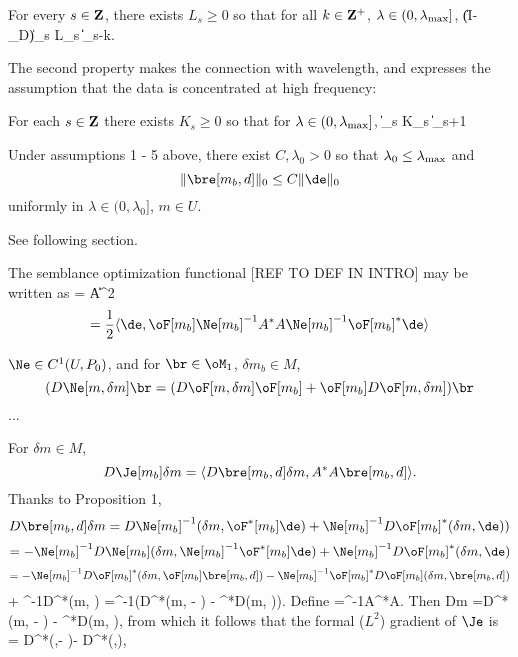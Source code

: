  For every $s \in \bf{Z}$, there exists
$L_s \ge 0$ so that for all $k \in \bf{Z}^+$, $\lambda \in
(0, \lambda_{\rm max}]$,
\be
\label{micro}
\|(I- \Pi_D)\de\|_s \le L_s \|\de\|_{s-k}.
\ee

The second property makes the connection with wavelength, and expresses
the assumption that the data is concentrated at high frequency:

For each $s \in \bf{Z}$ there exists $K_s
\ge 0$ so that for  $\lambda \in
(0, \lambda_{\rm max}]$,
\be
\label{hfcd}
\|\de\|_{s} \le K_s \lambda\|\de\|_{s+1}
\ee

Under assumptions 1 - 5 above, there exist $C,\lambda_0>0$ so that $\lambda_0 \le \lambda_{\rm max}$ and
\[
\|\bre[m_b,d]\|_0 \le C\|\de\|_0
\]
uniformly in $\lambda \in (0,\lambda_0]$, $m \in U$.


 See following section. %


The semblance optimization functional [REF TO DEF IN INTRO] may be written as
\be
\label{tgt}
\Je[m_b] = \|A\bre[m_b,d]\|^2
\ee
\[
=\frac{1}{2}\langle \de, \oF[m_b]\Ne[m_b]^{-1} A^*A \Ne[m_b]^{-1}\oF[m_b]^*\de \rangle
\]

 $\Ne \in C^1(U,P_0)$, and for $\br \in \oM_1$, $\delta m_b \in M$,
\[
(D\Ne[m,\delta m]\br = (D\oF[m,\delta m]\oF[m_b]+\oF[m_b]D\oF[m,\delta m])\br
\]
 ...

For $\delta m \in M$,
\[
D\Je[m_b]\delta m = \langle D\bre[m_b,d]\delta m, A^*A\bre[m_b,d]\rangle.
\]
Thanks to Proposition 1,
\[
D\bre[m_b,d]\delta m = 
D\Ne[m_b]^{-1}(\delta m,\oF^*[m_b]\de) + \Ne[m_b]^{-1}D\oF[m_b]^*(\delta m, \de))
\]
\[
= -\Ne[m_b]^{-1}D\Ne[m_b](\delta m,\Ne[m_b]^{-1}\oF^*[m_b]\de) + \Ne[m_b]^{-1}D\oF[m_b]^*(\delta m, \de)
\]
\[
=-\Ne[m_b]^{-1}D\oF[m_b]^*(\delta m,\oF[m_b]\bre[m_b,d]) - \Ne[m_b]^{-1}\oF[m_b]^*D\oF[m_b](\delta m,\bre[m_b,d])
\]
\be
\label{prerderiv}
+ \Ne[m_b]^{-1}D\oF[m_b]^*(\delta m, \de)
\ee
\be
\label{rderiv}
=\Ne^{-1}(D\oF[m_b]^*(\delta m, \de - \oF[m_b]\bre[m_b,d]) - \oF[m_b]^*D\oF[m_b](\delta m, \bre[m_b,d])).
\ee
Define
\be
\label{qdef}
\bqe[m_b]=\Ne[m_b]^{-1}A^*A\bre[m_b,d].
\ee
Then
\be
\label{Jderiv}
D\Je[m_b]\delta m =\langle D\oF[m_b]^*(\delta m, \de - \oF[m_b]\bre[m_b,d]) - \oF[m_b]^*D\oF[m_b](\delta m, \bre[m_b,d]), \bqe[m_b]\rangle 
\ee
from which it follows that the formal ($L^2$) gradient of $\Je$ is 
\be
\label{grad}
\nabla \Je[m_b] = D\oF[m_b]^*(\bqe[m_b],\de - \oF[m_b]\bre[m_b,d])- D\oF[m_b]^*(\bre[m_b,d],\oF[m_b]\bqe[m_b]),
\ee

